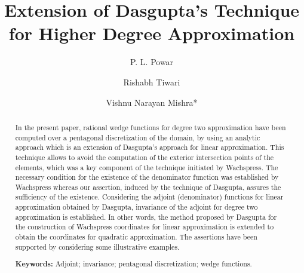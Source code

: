 

\usepackage{siunitx}
\usepackage{amsmath}
\usepackage{mathtools}
\RequirePackage[font=small,labelformat=parens,labelsep=space]{subcaption}



\title{Extension of Dasgupta's Technique for Higher Degree Approximation}

\author[1]{P. L. Powar}
\author[1]{Rishabh Tiwari}
\author[2]{Vishnu Narayan Mishra*}




\maketitle

\begin{abstract}
In the present paper, rational wedge functions for degree two approximation have
been computed over a pentagonal discretization of the domain, by using an
analytic approach which is an extension of Dasgupta\rq{}s approach for linear
approximation. This technique allows to avoid the computation of the exterior
intersection points of the elements, which was a key component of the technique
initiated by Wachspress. The necessary condition for the existence of the
denominator function was established by Wachspress whereas our assertion,
induced by the technique of Dasgupta, assures the sufficiency of the existence.
Considering the adjoint (denominator) functions for linear approximation
obtained by Dasgupta, invariance of the adjoint for degree two approximation is
established. In other words, the method proposed by Dasgupta for the
construction of Wachspress coordinates for linear approximation is extended to
obtain the coordinates for quadratic approximation. The assertions have been
supported by considering some illustrative examples.

\textbf{Keywords:} Adjoint; invariance; pentagonal discretization; wedge functions.
\end{abstract}

